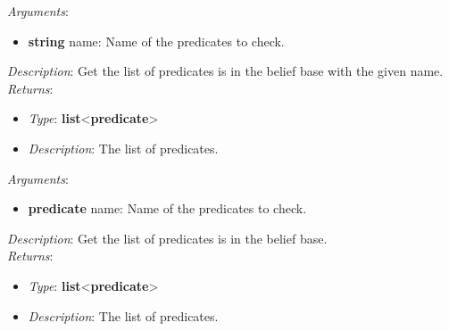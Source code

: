 \documentclass[a4paper]{article}
\newenvironment{blueblock}[1]{%
    \tcolorbox[beamer,%
    noparskip,breakable,
    colback=LightBlue,colframe=DarkBlue,%
    colbacklower=DarkBlue!75!LightBlue,%
    title=#1]}%
    {\endtcolorbox}
\begin{document}
            \begin{blueblock}{get\_beliefs\_with\_name(name)}
                \textit{Arguments}:
                \begin{itemize}
                    \item \textbf{string} name: Name of the predicates to check.
                \end{itemize}
                \textit{Description}: Get the list of predicates is in the belief base with the given name.\\
                \textit{Returns}:
                \begin{itemize}
                    \item \textit{Type}: \textbf{list}<\textbf{predicate}>
                    \item \textit{Description}: The list of predicates.
                \end{itemize}
            \end{blueblock}

            \begin{blueblock}{get\_beliefs(name)}
                \textit{Arguments}:
                \begin{itemize}
                    \item \textbf{predicate} name: Name of the predicates to check.
                \end{itemize}
                \textit{Description}: Get the list of predicates is in the belief base.\\
                \textit{Returns}:
                \begin{itemize}
                    \item \textit{Type}: \textbf{list}<\textbf{predicate}>
                    \item \textit{Description}: The list of predicates.
                \end{itemize}
            \end{blueblock}
\end{document}
